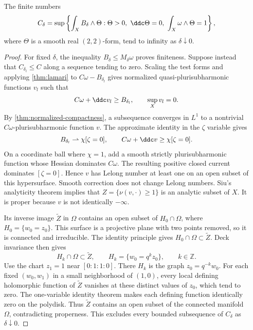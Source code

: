 \begin{lemma}\label{lem:lower-mass-trace-concentration}
The finite numbers
\[
 C_\delta=\sup\left\{\int_XB_\delta\wedge\Theta:
 \Theta>0,\ \ddc\Theta=0,\ \int_X\omega\wedge\Theta=1\right\},
\]
where $\Theta$ is a smooth real $(2,2)$-form, tend to infinity as $\delta\downarrow0$.
\end{lemma}
\begin{proof}
For fixed $\delta$, the inequality $B_\delta\leq M_\delta\omega$ proves finiteness. Suppose instead that $C_{\delta_l}\leq C$ along a sequence tending to zero. Scaling the test forms and applying \cref{thm:lamari} to $C\omega-B_{\delta_l}$ gives normalized quasi-plurisubharmonic functions $v_l$ such that
\[
 C\omega+\ddc v_l\geq B_{\delta_l},\qquad \sup_Xv_l=0.
\]
By \cref{thm:normalized-compactness}, a subsequence converges in $L^1$ to a nontrivial $C\omega$-plurisubharmonic function $v$. The approximate identity in the $\zeta$ variable gives
\[
 B_{\delta_l}\rightharpoonup\chi[\zeta=0],\qquad
 C\omega+\ddc v\geq\chi[\zeta=0].
\]
On a coordinate ball where $\chi=1$, add a smooth strictly plurisubharmonic function whose Hessian dominates $C\omega$. The resulting positive closed current dominates $[\zeta=0]$. Hence $v$ has Lelong number at least one on an open subset of this hypersurface. Smooth correction does not change Lelong numbers. Siu's analyticity theorem \cite[Theorem~I]{Siu74} implies that
$Z=\{\nu(v,\cdot)\geq1\}$ is an analytic subset of $X$. It is proper because $v$ is not identically $-\infty$.

Its inverse image $\widetilde Z$ in $\Omega$ contains an open subset of
$H_0\cap\Omega$, where $H_0=\{w_0=z_0\}$. This surface is a projective plane with two points removed, so it is connected and irreducible. The identity principle gives $H_0\cap\Omega\subset\widetilde Z$. Deck invariance then gives
\[
 H_k\cap\Omega\subset\widetilde Z,\qquad H_k=\{w_0=q^kz_0\},
 \qquad k\in\mathbb Z.
\]
Use the chart $z_1=1$ near $[0:1:1:0]$. There $H_k$ is the graph $z_0=q^{-k}w_0$. For each fixed $(w_0,w_1)$ in a small neighborhood of $(1,0)$, every local defining holomorphic function of $\widetilde Z$ vanishes at these distinct values of $z_0$, which tend to zero. The one-variable identity theorem makes each defining function identically zero on the polydisk. Thus $\widetilde Z$ contains an open subset of the connected manifold $\Omega$, contradicting properness. This excludes every bounded subsequence of $C_\delta$ as $\delta\downarrow0$.
\end{proof}

